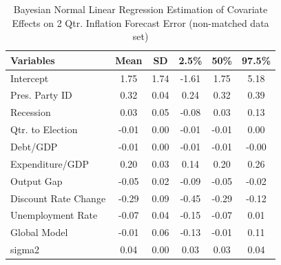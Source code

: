\documentclass[a4paper]{article}\usepackage{graphicx, color}
\begin{document}
\begin{table}[ht]
\begin{center}
\caption{Bayesian Normal Linear Regression Estimation of Covariate Effects on 2 Qtr. Inflation Forecast Error (non-matched data set)}
\label{OutputNB}
{\small
\begin{tabular}{lccccc}
  \hline
Variables & Mean & SD & 2.5\% & 50\% & 97.5\% \\ 
  \hline
Intercept & 1.75 & 1.74 & -1.61 & 1.75 & 5.18 \\ 
  Pres. Party ID & 0.32 & 0.04 & 0.24 & 0.32 & 0.39 \\ 
  Recession & 0.03 & 0.05 & -0.08 & 0.03 & 0.13 \\ 
  Qtr. to Election & -0.01 & 0.00 & -0.01 & -0.01 & 0.00 \\ 
  Debt/GDP & -0.01 & 0.00 & -0.01 & -0.01 & -0.00 \\ 
  Expenditure/GDP & 0.20 & 0.03 & 0.14 & 0.20 & 0.26 \\ 
  Output Gap & -0.05 & 0.02 & -0.09 & -0.05 & -0.02 \\ 
  Discount Rate Change & -0.29 & 0.09 & -0.45 & -0.29 & -0.12 \\ 
  Unemployment Rate & -0.07 & 0.04 & -0.15 & -0.07 & 0.01 \\ 
  Global Model & -0.01 & 0.06 & -0.13 & -0.01 & 0.11 \\ 
  sigma2 & 0.04 & 0.00 & 0.03 & 0.03 & 0.04 \\ 
   \hline
\end{tabular}
}
\end{center}
\end{table}




\end{document}
